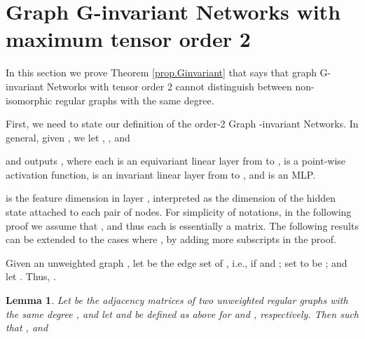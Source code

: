 \documentclass{article}
\newtheorem{lemma}{Lemma}
\begin{document}
\section{Graph G-invariant Networks with maximum tensor order 2} \label{app.Ginvariant}




In this section we prove Theorem \ref{prop.Ginvariant} that says that graph G-invariant Networks with tensor order 2 cannot distinguish between non-isomorphic regular graphs with the same degree.

First, we need to state our definition of the order-2 Graph -invariant Networks. In general, given , we let , , and

and outputs , where each  is an equivariant linear layer from  to ,  is a point-wise activation function,  is an invariant linear layer from  to , and  is an MLP.

 is the feature dimension in layer , interpreted as the dimension of the hidden state attached to each pair of nodes. For simplicity of notations, in the following proof we assume that , and thus each  is essentially a matrix.
The following results can be extended to the cases where , by adding more subscripts in the proof.

Given an unweighted graph , let  be the edge set of , i.e.,  if  and ; set  to be ; and let . Thus, .

\begin{lemma}
Let  be the adjacency matrices of two unweighted regular graphs with the same degree , and let  and  be defined as above for  and , respectively. Then  such that , and 
\end{lemma}
\end{document}
